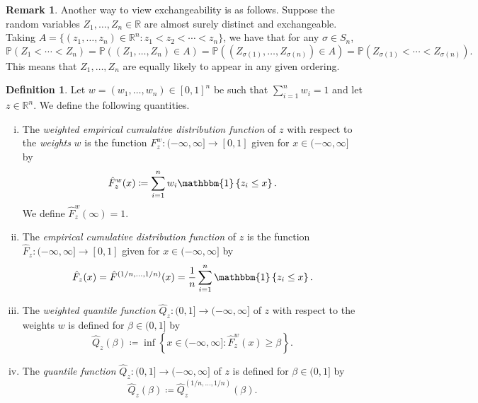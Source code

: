 \documentclass[11pt, titlepage]{article} %
\newcommand{\Prob}[1]{\mathbb{P}\left( #1 \right)}
\newcommand{\Ind}[1]{\mathbbm{1}\left\{ #1 \right\}}
\numberwithin{equation}{section}
\theoremstyle{definition}
\newtheorem{definition}{Definition}
\newtheorem{remark}{Remark}
\numberwithin{theorem}{section}
\numberwithin{lemma}{section}
\numberwithin{corollary}{section}
\numberwithin{proposition}{section}
\numberwithin{definition}{section}
\numberwithin{remark}{section}
\begin{document}
\begin{remark}
    Another way to view exchangeability is as follows. Suppose the random variables \(Z_1, \ldots, Z_n \in \mathbb{R}\) are almost surely distinct and exchangeable. Taking \(A = \{(z_1, \ldots, z_n) \in \mathbb{R}^n : z_1 < z_2 < \cdots < z_n \}\), we have that for any \(\sigma \in S_n\), \[\Prob{Z_1 < \cdots < Z_n} = \Prob{(Z_1, \ldots, Z_n) \in A} = \Prob{(Z_{\sigma(1)}, \ldots, Z_{\sigma(n)}) \in A} = \Prob{Z_{\sigma(1)} < \cdots < Z_{\sigma(n)}}.\] This means that \(Z_1, \ldots, Z_n\) are equally likely to appear in any given ordering.
\label{rmk:exch_ordering}
\end{remark}


\begin{definition}
    Let \(w = (w_1, \ldots, w_n) \in [0,1]^n\) be such that \(\sum_{i=1}^n w_i = 1\) and let \(z \in \mathbb{R}^n\). We define the following quantities. \begin{enumerate}[(i)] \itemsep0em
        \item The \textit{weighted empirical cumulative distribution function} of \(z\) with respect to the \textit{weights} \(w\) is the function \(F^w_z: (-\infty, \infty] \to [0,1]\) given for \(x \in (-\infty, \infty]\) by \[\hat{F}^{w}_z(x) \coloneqq \sum_{i=1}^n w_i \Ind{z_i \leq x}.  \] We define \(\hat{F}^w_z(\infty) = 1\).
        \item The \textit{empirical cumulative distribution function} of \(z\) is the function \(\hat{F}_z: (-\infty, \infty] \to [0,1]\) given for \(x \in (-\infty, \infty]\) by \[\hat{F}_z(x) = \hat{F}^{(1/n, \ldots, 1/n)}(x) = \frac{1}{n}\sum_{i=1}^n \Ind{z_i \leq x}.\]
        \item The \textit{weighted quantile function} \(\hat{Q}_z:(0,1] \to (-\infty, \infty]\) of \(z\) with respect to the weights \(w\) is defined for \(\beta \in (0,1]\) by \[\hat{Q}_z(\beta) \coloneqq \inf \left\{ x \in (-\infty, \infty]: \hat{F}^w_z(x) \geq \beta \right\}.\]
        \item The \textit{quantile function} \(\hat{Q}_z:(0,1] \to (-\infty, \infty]\) of \(z\) is defined for \(\beta \in (0,1]\) by \[\hat{Q}_z(\beta) \coloneqq \hat{Q}^{(1/n, \ldots, 1/n)}_z(\beta).\]
    \end{enumerate}
\label{defn:empirical_cdfquantile}
\end{definition}
\end{document}
